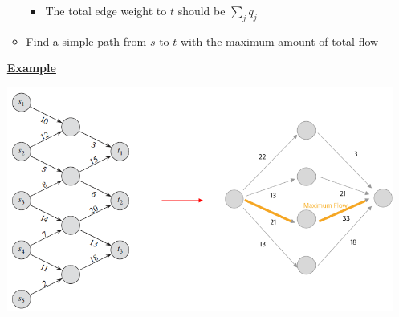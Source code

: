 \documentclass[12pt]{article}
\begin{document}
\begin{enumerate}[1.]
\begin{mdframed}
\begin{itemize}
            \begin{itemize}
                \item The total edge weight to $t$ should be $\sum\limits_{j} q_j$
            \end{itemize}


            \item Find a simple path from $s$ to $t$ with the maximum amount of total flow
        \end{itemize}

        \color{red}\underline{\textbf{Example}}\color{black}

        \begin{center}
        \includegraphics[width=0.9\linewidth]{images/worksheet_5_solution_17.png}
        \end{center}

    \end{mdframed}

    \bigskip









\end{enumerate}
\end{document}
